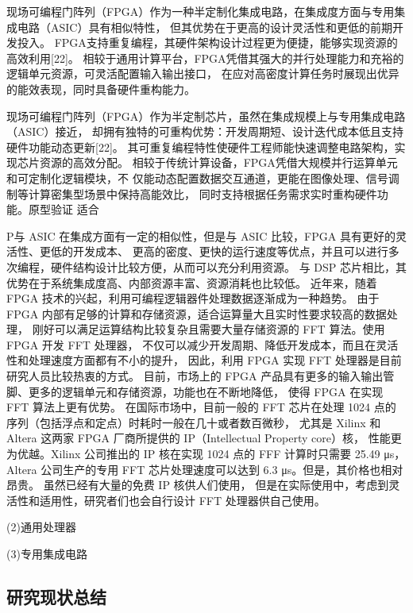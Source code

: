 现场可编程门阵列（FPGA）作为一种半定制化集成电路，在集成度方面与专用集成电路（ASIC）具有相似特性，
但其优势在于更高的设计灵活性和更低的前期开发投入。
FPGA支持重复编程，其硬件架构设计过程更为便捷，能够实现资源的高效利用[22]。
相较于通用计算平台，FPGA凭借其强大的并行处理能力和充裕的逻辑单元资源，可灵活配置输入输出接口，
在应对高密度计算任务时展现出优异的能效表现，同时具备硬件重构能力。

现场可编程门阵列（FPGA）作为半定制芯片，虽然在集成规模上与专用集成电路（ASIC）接近，
却拥有独特的可重构优势：开发周期短、设计迭代成本低且支持硬件功能动态更新[22]。
其可重复编程特性使硬件工程师能快速调整电路架构，实现芯片资源的高效分配。
相较于传统计算设备，FPGA凭借大规模并行运算单元和可定制化逻辑模块，不
仅能动态配置数据交互通道，更能在图像处理、信号调制等计算密集型场景中保持高能效比，
同时支持根据任务需求实时重构硬件功能。原型验证
适合

P与 ASIC 在集成方面有一定的相似性，但是与 ASIC 比较，FPGA 具有更好的灵活性、更低的开发成本、
更高的密度、更快的运行速度等优点，并且可以进行多次编程，硬件结构设计比较方便，从而可以充分利用资源。
与 DSP 芯片相比，其优势在于系统集成度高、内部资源丰富、资源消耗也比较低。
近年来，随着 FPGA 技术的兴起，利用可编程逻辑器件处理数据逐渐成为一种趋势。
由于 FPGA 内部有足够的计算和存储资源，适合运算量大且实时性要求较高的数据处理，
刚好可以满足运算结构比较复杂且需要大量存储资源的 FFT 算法。使用 FPGA 开发 FFT 处理器，
不仅可以减少开发周期、降低开发成本，而且在灵活性和处理速度方面都有不小的提升，
因此，利用 FPGA 实现 FFT 处理器是目前研究人员比较热衷的方式。
目前，市场上的 FPGA 产品具有更多的输入输出管脚、更多的逻辑单元和存储资源，功能也在不断地降低，
使得 FPGA 在实现 FFT 算法上更有优势。
在国际市场中，目前一般的 FFT 芯片在处理 1024 点的序列（包括浮点和定点）时耗时一般在几十或者数百微秒，
尤其是 Xilinx 和 Altera 这两家 FPGA 厂商所提供的 IP（Intellectual Property core）核，
性能更为优越。Xilinx 公司推出的 IP 核在实现 1024 点的 FFF 计算时只需要 25.49 μs，
Altera 公司生产的专用 FFT 芯片处理速度可以达到 6.3 μs。但是，其价格也相对昂贵。
虽然已经有大量的免费 IP 核供人们使用，
但是在实际使用中，考虑到灵活性和适用性，研究者们也会自行设计 FFT 处理器供自己使用。


(2)通用处理器

(3)专用集成电路
\subsection[\hspace{-2pt}研究现状总结]{{ \hspace{-8pt}}研究现状总结}\label{section 1-2-3}

